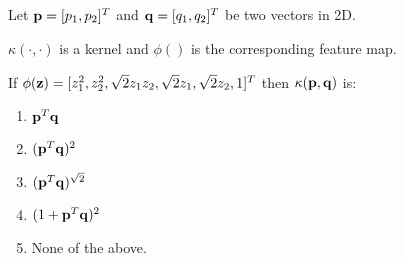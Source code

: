\begin{frame}
\section{}
Let ${\bf p} = [p_1, p_2]^T$ and ${\bf q} = [q_1, q_2]^T$ be two vectors in 2D.

$\kappa(\cdot,\cdot)$ is a kernel and $\phi()$ is the corresponding feature map.

If $\phi({\bf z}) = [z_1^2, z_2^2, \sqrt{2} z_1  z_2,  \sqrt{2} z_1, \sqrt{2} z_2, 1]^T$ then $\kappa({\bf p}, {\bf q})$ is:

\begin{enumerate}[label=(\Alph*)]
\item ${\bf p}^T{\bf q}$
\item $({\bf p}^T{\bf q})^2$
\item $({\bf p}^T{\bf q})^{\sqrt{2}}$
\item $(1+{\bf p}^T{\bf q})^2$   %
\item None of the above.    %
\end{enumerate}
\end{frame}
